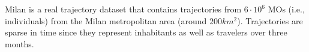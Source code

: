 \documentclass[
]{ceurart}
\renewcommand{\sf}[1]{\textsf{\textup{#1}}}
\begin{document}
\sf{Milan} is a real trajectory dataset that contains trajectories from $6 \cdot 10^6$ MOs (i.e., individuals) from the Milan metropolitan area (around $200 km^2$).
Trajectories are sparse in time since they represent inhabitants as well as travelers over three months.
\end{document}

